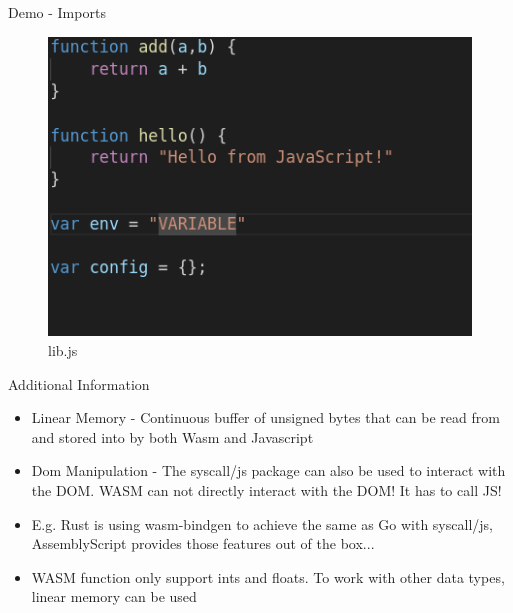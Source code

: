 \documentclass{beamer}
\begin{document}
\begin{frame}{Demo - Imports}
\begin{figure}
    \includegraphics[scale=0.4]{./images/libjs.png}
    \caption{lib.js}
\end{figure}

\end{frame}

\begin{frame}{Additional Information}
\begin{itemize}
    \item Linear Memory - Continuous buffer of unsigned bytes that can be read from and stored into by both Wasm and Javascript
    \item Dom Manipulation - The syscall/js package can also be used to interact with the DOM. WASM can not directly interact with the DOM! It has to call JS!
    \item E.g. Rust is using wasm-bindgen to achieve the same as Go with syscall/js, AssemblyScript provides those features out of the box...
    \item WASM function only support ints and floats. To work with other data types, linear memory can be used
\end{itemize}
\end{frame}
\end{document}
